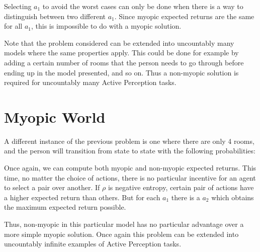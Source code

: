 Selecting $a_1$ to avoid the worst cases can only be done when there is a way to distinguish between
two different $a_1$.  Since myopic expected returns are the same for all $a_1$, this is impossible
to do with a myopic solution.

Note that the problem considered can be extended into uncountably many models where the same
properties apply. This could be done for example by adding a certain number of rooms that the person
needs to go through before ending up in the model presented, and so on. Thus a non-myopic solution
is required for uncountably many Active Perception tasks.

\section{Myopic World}

A different instance of the previous problem is one where there are only 4 rooms, and the person
will transition from state to state with the following probabilities:

\begin{center}
\end{center}

Once again, we can compute both myopic and non-myopic expected returns. This time, no matter the
choice of actions, there is no particular incentive for an agent to select a pair over another. If
$\rho$ is negative entropy, certain pair of actions have a higher expected return than others. But
for each $a_1$ there is a $a_2$ which obtains the maximum expected return possible.

Thus, non-myopic in this particular model has no particular advantage over a more simple myopic
solution. Once again this problem can be extended into uncountably infinite examples of Active
Perception tasks.

